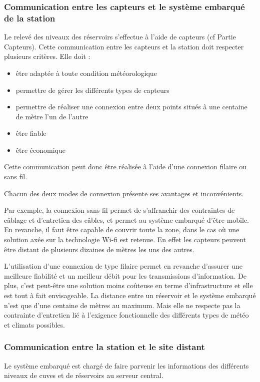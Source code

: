 \documentclass{article}
\begin{document}
\subsubsection{Communication entre les capteurs et le système embarqué de la
station}
Le relevé des niveaux des réservoirs s’effectue à l’aide de capteurs (cf
Partie Capteurs). Cette communication entre les capteurs et la station
doit respecter plusieurs critères. Elle doit : 

\begin{itemize}
\item être adaptée à toute condition météorologique
\item permettre de gérer les différents types de capteurs
\item permettre de réaliser une connexion entre deux points situés à une
centaine de mètre l’un de l’autre
\item être fiable
\item être économique
\end{itemize}
Cette communication peut donc être réalisée à l’aide d’une connexion
filaire ou sans fil.

Chacun des deux modes de connexion présente ses avantages et
inconvénients. 

Par exemple, la connexion sans fil permet de s’affranchir des
contraintes de câblage et d'entretien des câbles, et
permet au système embarqué d’être mobile. En revanche, il faut être
capable de couvrir toute la zone, dans le cas où une solution axée sur
la technologie Wi-fi est retenue. En effet les capteurs peuvent être
distant de plusieurs dizaines de mètres les uns des autres.

L’utilisation d’une connexion de type filaire permet en revanche
d’assurer une meilleure fiabilité et un meilleur débit pour les
transmissions d’information. De plus, c’est peut-être une solution
moins coûteuse en terme d’infrastructure et elle est tout à fait
envisageable. La distance entre un réservoir et le système embarqué
n’est que d’une centaine de mètres au maximum. Mais elle ne respecte
pas la contrainte d’entretien lié à l’exigence fonctionnelle des
différents types de météo et climats possibles.

\subsubsection{Communication entre la station et le site distant}
Le système embarqué est chargé de faire parvenir les informations des
différents niveaux de cuves et de réservoirs au serveur central. 
\end{document}
